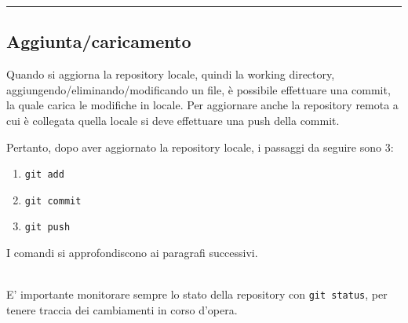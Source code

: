 \hrule
\subsection{Aggiunta/caricamento}
Quando si aggiorna la repository locale, quindi la working directory, aggiungendo/eliminando/modificando un file, è possibile effettuare una commit, la quale carica le modifiche in locale. Per aggiornare anche la repository remota a cui è collegata quella locale si deve effettuare una push della commit.\vspace{.2cm}\\
\begin{minipage}{0.48\textwidth}
Pertanto, dopo aver aggiornato la repository locale, i passaggi da seguire sono 3:
\begin{tcolorbox}[left=0cm, colframe=red!50!gray]
\begin{enumerate}[noitemsep, topsep=0pt]
	\item \texttt{git add}
	\item \texttt{git commit}
	\item \texttt{git push}
\end{enumerate}
\end{tcolorbox}
I comandi si approfondiscono ai paragrafi successivi.
\end{minipage}
\hfill
\begin{minipage}{0.48\textwidth}
\begin{adjustbox}{width=0.48\paperwidth,center}

\end{adjustbox}
\end{minipage}\vspace{.2cm}\\
E' importante monitorare sempre lo stato della repository con \texttt{git status}, per tenere traccia dei cambiamenti in corso d'opera.


